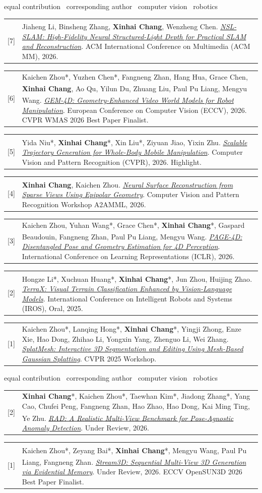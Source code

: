 \documentclass[10pt, letterpaper]{article}
\makeatletter
\newcommand{\cvtag}{\textcolor{visionColor}{\raisebox{1pt}{\scalebox{0.58}{\faCircle}}}}
\newcommand{\robtag}{\textcolor{robotColor}{\raisebox{1pt}{\scalebox{0.58}{\faCircle}}}}
\newcommand{\bothTags}{\cvtag\hspace{2.6pt}\robtag}
\newcommand{\corrtag}{\textdagger}
\newcommand{\corrmark}{\nobreak\hspace{0.5pt}\textsuperscript{\corrtag}}
\newcommand{\legend}{\small * equal contribution \quad \corrtag\ corresponding author \quad \cvtag\ computer vision \quad \robtag\ robotics\normalsize\par\vspace{0.18cm}}
\newlength{\cvcontentoffset}
\newif\ifcvfirstsection
\newif\ifshowsectiondividers
\newcommand{\cvdivider}{%
    \par\vspace{0.17cm}%
    \noindent\hspace*{\cvcontentoffset}%
    \makebox[\dimexpr\linewidth-\cvcontentoffset\relax][l]{%
        \ifshowsectiondividers
            {\color{dividerColor}\xleaders\hbox{\rule{4pt}{0.35pt}\hspace{3pt}}\hfill\kern0pt}%
        \else
            \rule{0pt}{0.35pt}%
        \fi
    }%
    \par\vspace{0.15cm}%
}
\newcommand{\cvsection}[2]{%
    \ifcvfirstsection
        \global\cvfirstsectionfalse
        \vspace{0.24cm}
    \else
        \cvdivider
    \fi
    \begin{cvblocks}
        \item[#1] #2
    \end{cvblocks}
}
\newcommand{\pubitem}[3]{%
    \noindent
    \begin{tabularx}{\linewidth}{@{}r@{\hspace{0.55em}}X@{}}
        [#1] & #2\nobreak\hspace{0.25em}\mbox{#3}
    \end{tabularx}\vspace{0.15cm}
}
\newcommand{\recognition}[1]{{\normalfont\color{ink}#1}}
\makeatother
\begin{document}
\cvsection{Publications}{
    \legend
    \pubitem{7}{Jiaheng Li, Binsheng Zhang, \textbf{Xinhai Chang}, Wenzheng Chen\corrmark. \href{https://arxiv.org/abs/2607.24495}{\textit{NSL-SLAM: High-Fidelity Neural Structured-Light Depth for Practical SLAM and Reconstruction}}. ACM International Conference on Multimedia (ACM MM), 2026.}{\cvtag}
    \pubitem{6}{Kaichen Zhou*, Yuzhen Chen*, Fangneng Zhan, Hang Hua, Grace Chen, \textbf{Xinhai Chang}, Ao Qu, Yilun Du, Zhuang Liu, Paul Pu Liang\corrmark, Mengyu Wang\corrmark. \href{https://arxiv.org/abs/2605.22882}{\textit{GEM-4D: Geometry-Enhanced Video World Models for Robot Manipulation}}. European Conference on Computer Vision (ECCV), 2026. \recognition{CVPR WMAS 2026 Best Paper Finalist}.}{\bothTags}
    \pubitem{5}{Yida Niu*, \textbf{Xinhai Chang}*, Xin Liu*, Ziyuan Jiao\corrmark, Yixin Zhu\corrmark. \href{https://arxiv.org/abs/2604.12565}{\textit{Scalable Trajectory Generation for Whole-Body Mobile Manipulation}}. Computer Vision and Pattern Recognition (CVPR), 2026. \recognition{Highlight}.}{\robtag}
    \pubitem{4}{\textbf{Xinhai Chang}, Kaichen Zhou\corrmark. \href{https://arxiv.org/abs/2406.04301}{\textit{Neural Surface Reconstruction from Sparse Views Using Epipolar Geometry}}. Computer Vision and Pattern Recognition Workshop A2AMML, 2026.}{\cvtag}
    \pubitem{3}{Kaichen Zhou, Yuhan Wang*, Grace Chen*, \textbf{Xinhai Chang}*, Gaspard Beaudouin, Fangneng Zhan, Paul Pu Liang\corrmark, Mengyu Wang\corrmark. \href{https://arxiv.org/abs/2510.17568}{\textit{PAGE-4D: Disentangled Pose and Geometry Estimation for 4D Perception}}. International Conference on Learning Representations (ICLR), 2026.}{\cvtag}
    \pubitem{2}{Hongze Li*, Xuchuan Huang*, \textbf{Xinhai Chang}*, Jun Zhou, Huijing Zhao\corrmark. \href{https://ieeexplore.ieee.org/document/11246334}{\textit{TerraX: Visual Terrain Classification Enhanced by Vision-Language Models}}. International Conference on Intelligent Robots and Systems (IROS), Oral, 2025.}{\bothTags}
    \pubitem{1}{Kaichen Zhou*, Lanqing Hong*, \textbf{Xinhai Chang}*, Yingji Zhong, Enze Xie, Hao Dong, Zhihao Li, Yongxin Yang, Zhenguo Li, Wei Zhang. \href{https://arxiv.org/abs/2312.15856}{\textit{SplatMesh: Interactive 3D Segmentation and Editing Using Mesh-Based Gaussian Splatting}}. CVPR 2025 Workshop.}{\cvtag}
}

\cvsection{Preprints}{
    \legend
    \pubitem{2}{\textbf{Xinhai Chang}*, Kaichen Zhou*, Taewhan Kim*, Jiadong Zhang*, Yang Cao, Chufei Peng, Fangneng Zhan, Hao Zhao, Hao Dong, Kai Ming Ting, Ye Zhu\corrmark. \href{https://arxiv.org/abs/2410.00713}{\textit{RAD: A Realistic Multi-View Benchmark for Pose-Agnostic Anomaly Detection}}. Under Review, 2026.}{\bothTags}
    \pubitem{1}{Kaichen Zhou*, Zeyang Bai*, \textbf{Xinhai Chang}*, Mengyu Wang\corrmark, Paul Pu Liang\corrmark, Fangneng Zhan\corrmark. \href{https://arxiv.org/abs/2605.21472}{\textit{Stream3D: Sequential Multi-View 3D Generation via Evidential Memory}}. Under Review, 2026. \recognition{ECCV OpenSUN3D 2026 Best Paper Finalist}.}{\cvtag}
}
\end{document}
